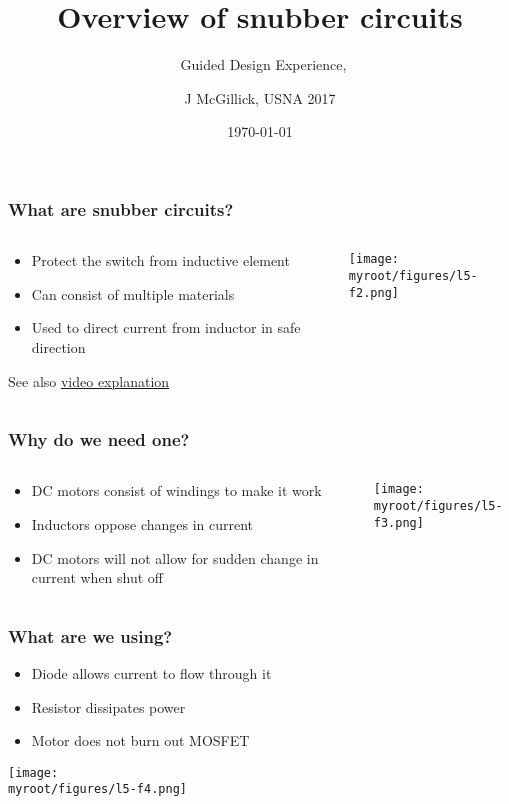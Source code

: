 \documentclass[aspectratio=169]{beamer}
\title{Overview of snubber circuits}
\subtitle{\usnaCourseNumber\ Guided Design Experience, \usnaCourseTerm}
\author{J McGillick, USNA 2017}
\date{\today}
\newcommand{\myroot}{../..}
\begin{document}
\settitlebg
\begin{frame}
\titlepage
\end{frame}

\setslidebg
\begin{frame}
\frametitle{What are snubber circuits?}
\begin{columns}
\begin{column}{0.5\textwidth}
\begin{itemize}
\item Protect the switch from inductive element
\item Can consist of multiple materials
\item Used to direct current from inductor in safe direction
\end{itemize}
See also \href{https://www.youtube.com/watch?v=LXGtE3X2k7Y}{video explanation}
\end{column}
\begin{column}{0.5\textwidth}
\begin{center}
\texttt{[image: \\myroot/figures/l5-f2.png]}
\end{center}
\end{column}
\end{columns}
\end{frame}

\begin{frame}
\frametitle{Why do we need one?}
\begin{columns}
\begin{column}{0.5\textwidth}
\begin{itemize}
\item DC motors consist of windings to make it work
\item Inductors oppose changes in current
\item DC motors will not allow for sudden change in current when shut off
\end{itemize}
\end{column}
\begin{column}{0.5\textwidth}
\begin{center}
\texttt{[image: \\myroot/figures/l5-f3.png]}
\end{center}
\end{column}
\end{columns}
\end{frame}

\begin{frame}
\frametitle{What are we using?}
\begin{itemize}
\item Diode allows current to flow through it
\item Resistor dissipates power
\item Motor does not burn out MOSFET
\end{itemize}
\begin{center}
\texttt{[image: \\myroot/figures/l5-f4.png]}
\end{center}
\end{frame}
\end{document}
